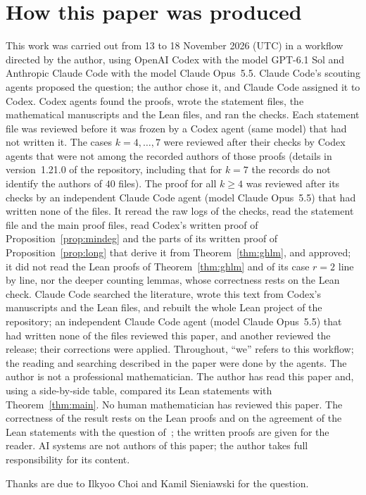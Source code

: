 \documentclass[11pt]{article}
\theoremstyle{remark}
\begin{document}
\section*{How this paper was produced}
This work was carried out from 13 to 18 November 2026 (UTC) in a
workflow directed by the author, using OpenAI Codex with the model GPT-6.1 Sol
and Anthropic Claude Code with the model Claude Opus~5.5. Claude Code's
scouting agents proposed the question; the author chose it, and Claude Code
assigned it to Codex. Codex agents found the proofs, wrote the statement files,
the mathematical manuscripts and the Lean files, and ran the checks. Each
statement file was reviewed before it was frozen by a Codex agent (same model)
that had not written it. The cases $k=4,\dots,7$ were reviewed after their
checks by Codex agents that were not among the recorded authors of those proofs
(details in version~1.21.0 of the repository, including that for $k=7$ the
records do not identify the authors of $40$ files). The proof for all $k\ge4$
was reviewed after its checks by an independent Claude Code agent (model Claude
Opus~5.5) that had written none of the files. It reread the raw logs of the
checks, read the statement file and the main proof files, read Codex's
written proof of Proposition~\ref{prop:mindeg} and the parts of its written
proof of Proposition~\ref{prop:long} that derive it from
Theorem~\ref{thm:ghlm}, and approved; it did not read the Lean proofs of
Theorem~\ref{thm:ghlm} and of its case $r=2$ line by line, nor the
deeper counting lemmas, whose correctness rests on the Lean check. Claude Code
searched the literature, wrote this text from Codex's manuscripts and the Lean
files, and rebuilt the whole Lean project of the repository; an independent
Claude Code agent (model Claude Opus~5.5) that had written none of the files reviewed this paper, and another reviewed the release; their corrections were applied. Throughout, ``we'' refers to this workflow;
the reading and searching described in the paper were done by the agents. The
author is not a professional mathematician. The author has read this paper and, using a side-by-side table, compared its Lean statements with Theorem~\ref{thm:main}. No human
mathematician has reviewed this paper. The correctness of the result rests on
the Lean proofs and on the agreement of the Lean statements with the question
of~\cite{cs}; the written proofs are given for the reader. AI systems are not
authors of this paper; the author takes full responsibility for its content.

\medskip
\noindent Thanks are due to Ilkyoo Choi and Kamil Sieniawski for the question.
\end{document}
